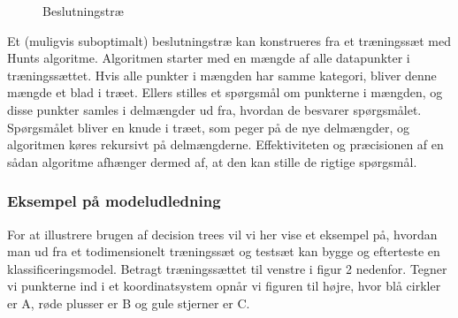 \documentclass{article}
\begin{document}
\begin{figure}[H]
\begin{center}
\end{center}
\caption{Beslutningstræ}
\end{figure}

Et (muligvis suboptimalt) beslutningstræ kan konstrueres fra et træningssæt med Hunts algoritme. Algoritmen starter med en mængde af alle datapunkter i træningssættet. Hvis alle punkter i mængden har samme kategori, bliver denne mængde et blad i træet. Ellers stilles et spørgsmål om punkterne i mængden, og disse punkter samles i delmængder ud fra, hvordan de besvarer spørgsmålet. Spørgsmålet bliver en knude i træet, som peger på de nye delmængder, og algoritmen køres rekursivt på delmængderne. Effektiviteten og præcisionen af en sådan algoritme afhænger dermed af, at den kan stille de rigtige spørgsmål.


\subsubsection{Eksempel på modeludledning}
For at illustrere brugen af decision trees vil vi her vise et eksempel på, hvordan man ud fra et todimensionelt træningssæt og testsæt kan bygge og efterteste en klassificeringsmodel. Betragt træningssættet til venstre i figur 2 nedenfor. Tegner vi punkterne ind i et koordinatsystem opnår vi figuren til højre, hvor blå cirkler er A, røde plusser er B og gule stjerner er C.
\end{document}
